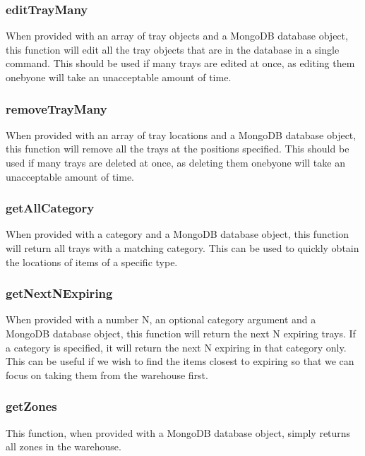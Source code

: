\documentclass[letterpaper,10pt,english]{sphinxmanual}
\begin{document}
\subsubsection{editTrayMany}
\label{\detokenize{docs/System_Overview/Backend_overview:edittraymany}}
When provided with an array of tray objects and a MongoDB database
object, this function will edit all the tray objects that are in the
database in a single command. This should be used if many trays are
edited at once, as editing them one\sphinxhyphen{}by\sphinxhyphen{}one will take an unacceptable
amount of time.


\subsubsection{removeTrayMany}
\label{\detokenize{docs/System_Overview/Backend_overview:removetraymany}}
When provided with an array of tray locations and a MongoDB database
object, this function will remove all the trays at the positions
specified. This should be used if many trays are deleted at once, as
deleting them one\sphinxhyphen{}by\sphinxhyphen{}one will take an unacceptable amount of time.


\subsubsection{getAllCategory}
\label{\detokenize{docs/System_Overview/Backend_overview:getallcategory}}
When provided with a category and a MongoDB database object, this
function will return all trays with a matching category. This can be
used to quickly obtain the locations of items of a specific type.


\subsubsection{getNextNExpiring}
\label{\detokenize{docs/System_Overview/Backend_overview:getnextnexpiring}}
When provided with a number N, an optional category argument and a
MongoDB database object, this function will return the next N expiring
trays. If a category is specified, it will return the next N expiring in
that category only. This can be useful if we wish to find the items
closest to expiring so that we can focus on taking them from the
warehouse first.


\subsubsection{getZones}
\label{\detokenize{docs/System_Overview/Backend_overview:getzones}}
This function, when provided with a MongoDB database object, simply
returns all zones in the warehouse.
\end{document}
